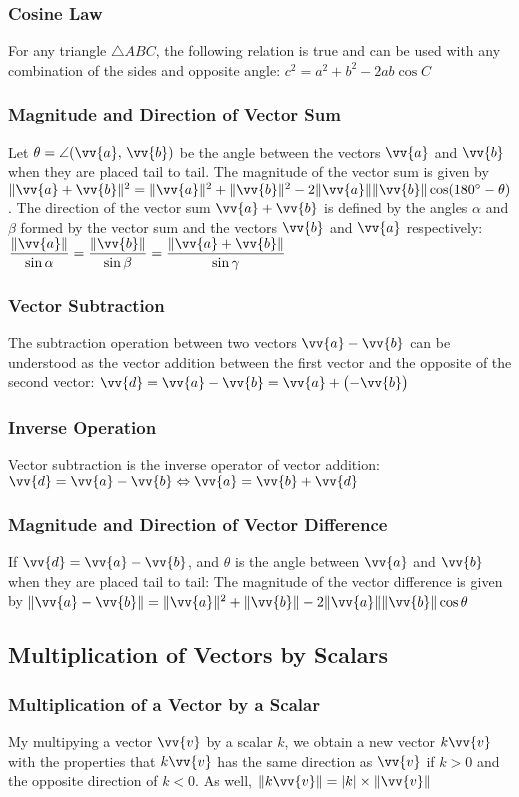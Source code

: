 \documentclass{article}
\newcommand{\mv}[1]{
	\lVert\vv{#1}\rVert
}
\begin{document}
	\subsubsection{Cosine Law}
	For any triangle $\triangle ABC$, the following relation is true and can be used with any combination of the sides and opposite angle: $c^2=a^2+b^2-2ab\cos C$
	\subsubsection{Magnitude and Direction of Vector Sum}
	Let $\theta=\angle (\vv{a},\,\vv{b})$ be the angle between the vectors $\vv{a}$ and $\vv{b}$ when they are placed tail to tail. The magnitude of the vector sum is given by $\lVert\vv{a}+\vv{b}\rVert^2=\mv{a}^2+\mv{b}^2-2\mv{a}\mv{b}\cos(180^\circ-\theta)$. The direction of the vector sum $\vv{a}+\vv{b}$ is defined by the angles $\alpha$ and $\beta$ formed by the vector sum and the vectors $\vv{b}$ and $\vv{a}$ respectively: $\dfrac{\mv{a}}{\sin\alpha}=\dfrac{\mv{b}}{\sin\beta}=\dfrac{\lVert\vv{a}+\vv{b}\rVert}{\sin\gamma}$
	\subsubsection{Vector Subtraction}
	The subtraction operation between two vectors $\vv{a}-\vv{b}$ can be understood as the vector addition between the first vector and the opposite of the second vector: $\vv{d}=\vv{a}-\vv{b}=\vv{a}+\left(-\vv{b}\right)$
	\subsubsection{Inverse Operation}
	Vector subtraction is the inverse operator of vector addition: $\vv{d}=\vv{a}-\vv{b}\Leftrightarrow\vv{a}=\vv{b}+\vv{d}$
	\subsubsection{Magnitude and Direction of Vector Difference}
	If $\vv{d}=\vv{a}-\vv{b}$, and $\theta$ is the angle between $\vv{a}$ and $\vv{b}$ when they are placed tail to tail: %
	The magnitude of the vector difference is given by $\lVert\vv{a}-\vv{b}\rVert=\mv{a}^2+\mv{b}-2\mv{a}\mv{b}\cos\theta$
	\subsection{Multiplication of Vectors by Scalars}
	\subsubsection{Multiplication of a Vector by a Scalar}
	My multipying a vector $\vv{v}$ by a scalar $k$, we obtain a new vector $k\vv{v}$ with the properties that $k\vv{v}$ has the same direction as $\vv{v}$ if $k>0$ and the opposite direction of $k<0$. As well, $\lVert k\vv{v}\rVert=|k|\times\mv{v}$
\end{document}
